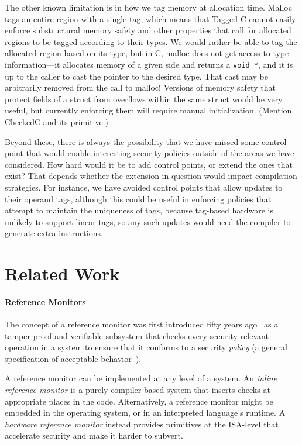 \documentclass{llncs}
\begin{document}
The other known limitation is in how we tag memory at allocation time. Malloc tags an
entire region with a single tag, which means that Tagged C cannot easily
enforce substructural memory safety and other properties that call for allocated
regions to be tagged according to their types. We would rather be able to tag the allocated region
based on its type, but in C, malloc does not get access to type information---it allocates
memory of a given side and returns a {\tt void *}, and it is up to the caller to cast the
pointer to the desired type. That cast may be arbitrarily removed from the call to malloc!
Versions of memory safety that protect fields of a
struct from overflows within the same struct would be very useful, but currently enforcing
them will require manual initialization. (Mention CheckedC and its primitive.)

Beyond these, there is always the possibility that we have missed some control point
that would enable interesting security policies outside of the areas we have considered.
How hard would it be to add control points, or extend the ones that exist? That depends
whether the extension in question would impact compilation strategies. For instance,
we have avoided control points that allow updates to their operand tags, although
this could be useful in enforcing policies that attempt to maintain the uniqueness of tags,
because tag-based hardware is unlikely to support linear tags, so any such updates would
need the compiler to generate extra instructions.

\section{Related Work}

\paragraph{Reference Monitors}

The concept of a reference monitor was first introduced fifty years ago~\cite{Anderson72:PlanningStudy}
as a tamper-proof and verifiable subsystem that checks every security-relevant operation in a system to
ensure that it conforms to a security {\em policy} (a general specification of acceptable behavior~\cite{Goguen82:SecurityPolicies}).

A reference monitor can be implemented at any level of a system. An {\em inline reference monitor}\cite{??}
is a purely compiler-based system that inserts checks at appropriate places in the code.
Alternatively, a reference monitor might be embedded in the operating system, or in an interpreted
language's runtime. A {\em hardware reference monitor} instead provides primitives at the ISA-level
that accelerate security and make it harder to subvert.
\end{document}

